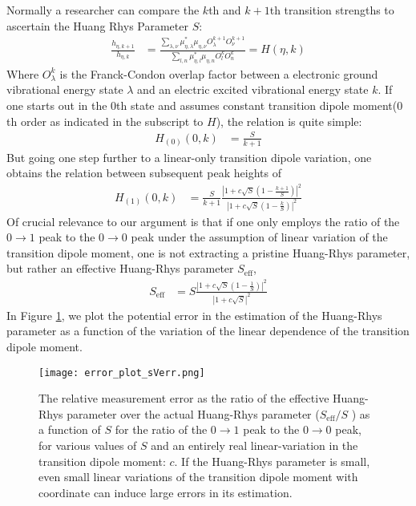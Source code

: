 Normally a researcher can compare the $k$th and $k+1$th transition strengths to ascertain the Huang Rhys Parameter $S$:
\begin{align}
	\frac{h_{\eta,k+1}}{h_{\eta,k}} &=  \frac{\sum_{\lambda,\nu} \mu_{\eta,\lambda}^*\mu_{\eta,\nu}   O_{\lambda}^{k+1} O_{\nu}^{k+1} }{\sum_{l,n} \mu_{\eta,l}^*\mu_{\eta,n}   O_{l}^{k} O_{n}^{k} } = H(\eta,k)
	\label{eqn:HDef}
\end{align}
Where $O_{\lambda}^{k}$ is the Franck-Condon overlap factor between a electronic ground vibrational energy state $\lambda$ and an electric excited vibrational energy state $k$.  If one starts out in the 0th state and assumes constant transition dipole moment($0$th order as indicated in the subscript to $H$), the relation is quite simple:
\begin{align}
	H_{(0)}(0, k)	&= \frac{S }{k+1 }
\end{align}
But going one step further to a linear-only transition dipole variation, one obtains the relation between subsequent peak heights of
\begin{align}
	H_{(1)}(0, k)	&=  \frac{S }{k+1 } \frac{\left| 1 + c\sqrt{S} \left( 1  - \frac{k+1}{S} \right) \right|^2}{\left| 1 + c \sqrt{S} \left( 1  - \frac{k}{S} \right)\right|^2 }
\end{align}
Of crucial relevance to our argument is that if one only employs the ratio of the $0 \rightarrow 1$ peak to the $0 \rightarrow 0$ peak under the assumption of linear variation of the transition dipole moment, one is not extracting a pristine Huang-Rhys parameter, but rather an effective Huang-Rhys parameter $S_{\text{eff}}$,
\begin{align}
	S_{\text{eff}}	&=  S \frac{\left| 1 + c \sqrt{S} \left( 1  - \frac{1}{S} \right) \right|^2}{\left| 1 + c \sqrt{S} \right|^2 }
\end{align}
In Figure \ref{fig:absorpstion_HRF_error_sVerr}, we plot the potential error in the estimation of the Huang-Rhys parameter as a function of the variation of the linear dependence of the transition dipole moment.
\begin{figure}
   \texttt{[image: error\_plot\_sVerr.png]}
   \caption{The relative measurement error as the ratio of the effective Huang-Rhys parameter over the actual Huang-Rhys parameter ($S_{\text{eff}} / S $ ) as a function of $S$ for the ratio of the $0\rightarrow1$ peak to the $0\rightarrow0$ peak, for various values of $S$ and an entirely real linear-variation in the transition dipole moment: $c$.  If the Huang-Rhys parameter is small, even small linear variations of the transition dipole moment with coordinate can induce large errors in its estimation.}
	\label{fig:absorpstion_HRF_error_sVerr}
\end{figure}

